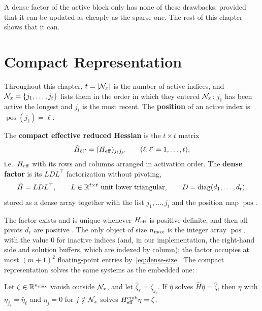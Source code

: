 \medskip

A dense factor of the active block only has none of these drawbacks, provided that it can be
updated as cheaply as the sparse one. The rest of this chapter shows that it can.


\section{Compact Representation}
\label{sec:compact}

Throughout this chapter, $t = |\mathcal{N}_x|$ is the number of active indices, and
$\mathcal{N}_x = \{j_1,\dots,j_t\}$ lists them in the order in which they entered $\mathcal{N}_x$: $j_1$ has been
active the longest and $j_t$ is the most recent. The \textbf{position} of an active index is
$\operatorname{pos}(j_\ell) = \ell$.

\begin{definition} \label{def:compact}
The \textbf{compact effective reduced Hessian} is the $t\times t$ matrix
\[
\hat H_{\ell\ell'} = (H_{\mathrm{eff}})_{j_\ell j_{\ell'}}\qquad(\ell,\ell' = 1,\dots,t),
\]
i.e.\ $H_{\mathrm{eff}}$ with its rows and columns arranged in activation order. The \textbf{dense
factor} is its $LDL^\top$ factorization without pivoting,
\[
\hat H = LDL^\top,\qquad L\in\mathbb{R}^{t\times t}\ \text{unit lower triangular},\qquad
D = \operatorname{diag}(d_1,\dots,d_t),
\]
stored as a dense array together with the list $j_1,\dots,j_t$ and the position map
$\operatorname{pos}$.
\end{definition}

The factor exists and is unique whenever $H_{\mathrm{eff}}$ is positive definite, and then all pivots
$d_\ell$ are positive \cite{golub2013matrix}. The only object of size $n_{\max}$ is the integer
array $\operatorname{pos}$, with the value $0$ for inactive indices (and, in our
implementation, the right-hand side and solution buffers, which are indexed by column); the
factor occupies at most $(m+1)^2$ floating-point entries by~\eqref{eq:dense-size}. The compact representation solves
the same systems as the embedded one:

\begin{lemma} \label{lem:compact-solve}
Let $\zeta\in\mathbb{R}^{n_{\max}}$ vanish outside $\mathcal{N}_x$, and let $\hat\zeta_\ell = \zeta_{j_\ell}$. If
$\hat\eta$ solves $\hat H\hat\eta = \hat\zeta$, then $\eta$ with $\eta_{j_\ell} = \hat\eta_\ell$ and
$\eta_j = 0$ for $j\notin\mathcal{N}_x$ solves $H_{\mathrm{eff}}^{\mathrm{emb}}\eta = \zeta$.
\end{lemma}


